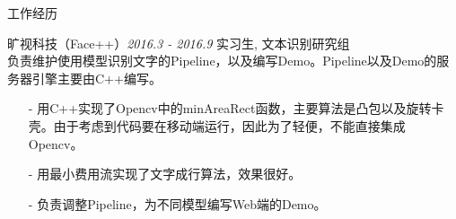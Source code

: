 \documentclass{resume} %
\begin{document}
\begin{rSection}{工作经历}

\begin{rSubsection}{旷视科技（Face++）}{\em 2016.3 - 2016.9}
{实习生, 文本识别研究组 \\}
{负责维护使用模型识别文字的Pipeline，以及编写Demo。Pipeline以及Demo的服务器引擎主要由C++编写。}
\item[]
\begin{itemize}
\setlength\itemsep{-0.5em}
\item[-] 用C++实现了Opencv中的minAreaRect函数，主要算法是凸包以及旋转卡壳。由于考虑到代码要在移动端运行，因此为了轻便，不能直接集成Opencv。
\item[-]用最小费用流实现了文字成行算法，效果很好。
\item[-] 负责调整Pipeline，为不同模型编写Web端的Demo。
\end{itemize}
\end{rSubsection}

\end{rSection}

\end{document}
